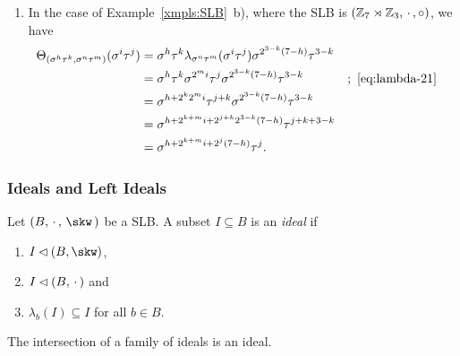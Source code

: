 \begin{xmpls}
\begin{enumerate}[\rm a)]
        \item In the case of Example~\ref{xmpls:SLB}~b), where the SLB is $(\mathbb{Z}_7\rtimes\mathbb{Z}_3,\,\cdot\,,\circ)$, we have
        \begin{align*}
            \Theta_{(\sigma^h\tau^k,\sigma^n\tau^m)}(\sigma^i\tau^j)
                &= \sigma^h\tau^k\lambda_{\sigma^n\tau^m}(\sigma^i\tau^j)
                    \sigma^{2^{3-k}(7-h)}\tau^{3-k}\\
                &= \sigma^h\tau^k
                    \sigma^{2^mi}\tau^j
                    \sigma^{2^{3-k}(7-h)}\tau^{3-k}
                    &&;\ \eqref{eq:lambda-21}\\
                &= \sigma^{h+2^k2^mi}\tau^{j+k}\sigma^{2^{3-k}(7-h)}
                    \tau^{3-k}\\
                &= \sigma^{h+2^{k+m}i+2^{j+k}2^{3-k}(7-h)}\tau^{j+k+3-k}\\
                &= \sigma^{h+2^{k+m}i+2^j(7-h)}\tau^j.
        \end{align*}
    \end{enumerate}
\end{xmpls}

\subsubsection*{Ideals and Left Ideals}

\begin{defn}
    Let $(B,\,\cdot\,,\,\skw\,)$ be a SLB. A subset $I\subseteq B$ is an \textsl{ideal\/} if
    \begin{enumerate}[-]
        \item $I\normal(B,\skw)$,
        \item $I\lhd(B,\,\cdot\,)$ and
        \item $\lambda_b(I)\subseteq I$ for all $b\in B$.
    \end{enumerate}
\end{defn}

\begin{rem}
    The intersection of a family of ideals is an ideal.
\end{rem}

